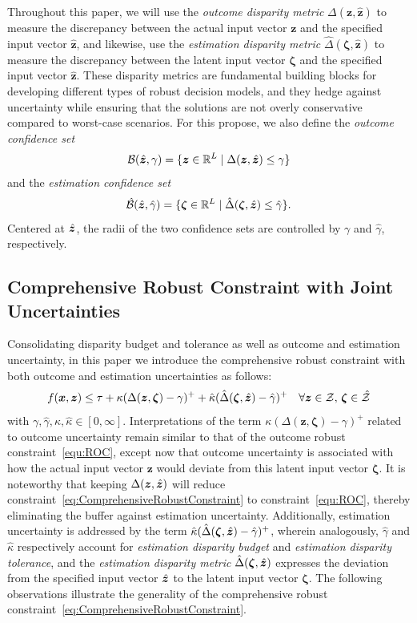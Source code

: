 \documentclass[mnsc, nonblindrev]{informswp}
\newcommand{\1}[1]{\mathds{1}{\left(#1\right)}}
\begin{document}
Throughout this paper, we will use the \textit{outcome disparity metric} $\Delta(\bm z, \hat{\bm z})$ to measure the discrepancy between the actual input vector $\bm z$ and the specified input vector $\hat{\bm z}$, and likewise, use the \textit{estimation disparity metric} $\hat \Delta(\bm \zeta, \hat{\bm z})$ to measure the discrepancy between the latent input vector $\bm \zeta$ and the specified input vector $\hat{\bm z}$. These disparity metrics are fundamental building blocks for developing different types of robust decision models, and they hedge against uncertainty while ensuring that the solutions are not overly conservative compared to worst-case scenarios. For this propose, we also define the {\em outcome confidence set}
$$
\mathcal{B}(\hat{\bm{z}}, \gamma) = \{ \bm z \in \mathbb{R}^L \;|\; \Delta(\bm z,\hat{\bm{z}}) \leq \gamma \}
$$
and the {\em estimation confidence set}
$$
\hat {\mathcal{B}}(\hat{\bm{z}}, 
\hat \gamma) = \{ \bm \zeta \in \mathbb{R}^L \;|\; \hat \Delta(\bm \zeta,\hat{\bm{z}}) \leq \hat \gamma \}. 
$$
Centered at $\hat{\bm{z}}$, the radii of the two confidence sets are controlled by $\gamma$ and $\hat \gamma$, respectively.

\subsection*{Comprehensive Robust Constraint with Joint Uncertainties}

Consolidating disparity budget and tolerance as well as outcome and estimation uncertainty, in this paper we introduce the comprehensive robust constraint with both outcome and estimation uncertainties as follows:
\begin{equation}
\label{eq:ComprehensiveRobustConstraint}
f(\bm x,\bm z) \leq \tau + \kappa (\Delta(\bm z,\bm \zeta) - \gamma)^+ + \hat \kappa (\hat \Delta(\bm \zeta,\hat{\bm{z}}) - \hat \gamma)^+ ~~~\forall \bm z \in \mathcal{Z} , \, \bm \zeta \in \hat {\mathcal{Z}}
\end{equation}
with $\gamma, \hat \gamma, \kappa, \hat \kappa \in [0, \infty]$. Interpretations of the term $\kappa (\Delta(\bm z,\bm \zeta) - \gamma)^+$ related to outcome uncertainty remain similar to that of the outcome robust constraint~\eqref{equ:ROC}, except now that outcome uncertainty is associated with how the actual input vector $\bm z$ would deviate from this latent input vector $\bm{\zeta}$. 
It is noteworthy that keeping $\Delta(\bm z,\hat{\bm{z}})$ will reduce constraint~\eqref{eq:ComprehensiveRobustConstraint} to constraint~\eqref{equ:ROC}, thereby eliminating the buffer against estimation uncertainty.
Additionally, estimation uncertainty is addressed by the term 
$\hat \kappa (\hat \Delta(\bm \zeta,\hat{\bm{z}}) - \hat \gamma)^+$, wherein analogously, $\hat \gamma$ and $\hat \kappa$ respectively account for \textit{estimation disparity budget} and \textit{estimation disparity  tolerance}, and the \textit{estimation disparity metric} $\hat \Delta(\bm \zeta,\hat{\bm{z}})$ expresses the deviation from the specified input vector $\hat{\bm{z}}$ to the latent input vector $\bm \zeta$. The following observations illustrate the generality of the comprehensive robust constraint~\eqref{eq:ComprehensiveRobustConstraint}.
\end{document}
